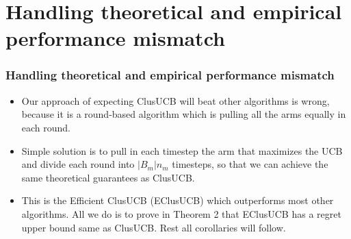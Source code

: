 \documentclass{beamer}
\begin{document}
\section{Handling theoretical and empirical performance mismatch} 
\begin{frame}
\frametitle{Handling theoretical and empirical performance mismatch}

\begin{itemize}
\item Our approach of expecting ClusUCB will beat other algorithms is wrong, because it is a round-based algorithm which is pulling all the arms equally in each round.
\item Simple solution is to pull in each timestep the arm that maximizes the UCB and divide each round into $|B_{m}|n_{m}$ timesteps, so that we can achieve the same theoretical guarantees as ClusUCB.
\item This is the Efficient ClusUCB (EClusUCB) which outperforms most other algorithms. All we do is to prove in Theorem 2 that EClusUCB has a regret upper bound same as ClusUCB. Rest all corollaries will follow.
\end{itemize}
\end{frame}
\end{document}
